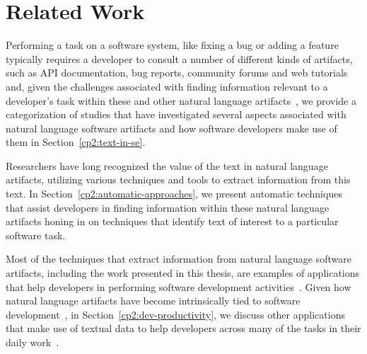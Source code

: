 \setcounter{chapter}{1}


\chapter{Related Work}
\label{ch:related-work}







Performing a task on a software system, like fixing a bug
or adding a feature typically requires a developer to consult
a number of different kinds of artifacts, such
as API documentation, bug reports, community forums
and web tutorials~\cite{umarji2008archetypal,Li2013}
and, given the challenges associated with finding
information relevant to a developer's task
within these and other natural language artifacts~\cite{Starke2009,DeGraaf2014},
we provide a categorization of studies that 
have 
investigated 
several aspects associated with natural language software artifacts
and how software developers make use of them in Section~\ref{cp2:text-in-se}.







Researchers have long recognized the value of the text in natural language
artifacts, utilizing various techniques and tools 
to extract information from this text. 
In Section~\ref{cp2:automatic-approaches}, 
we present automatic techniques that
assist developers in finding information within these natural language artifacts
honing in on techniques that identify text of interest 
to a particular software task.






Most of the techniques that extract information from natural language software artifacts, including the work presented in this thesis, 
are examples of applications that help developers in performing 
software development activities~\cite{Meyer2017}. 
Given how 
natural language artifacts have become intrinsically
tied to software development~\cite{liu2021, watson2022, umarji2008archetypal},
in Section~\ref{cp2:dev-productivity}, 
we discuss
other applications that make use of textual data
to help developers
across many of the tasks in their daily work~\cite{Treude2016,  robillard2017, silva2019}.




